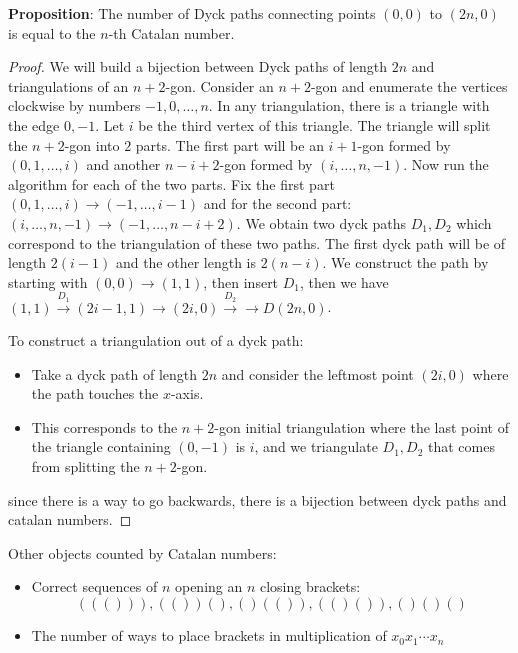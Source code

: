 \documentclass{report}
\begin{document}
\textbf{Proposition}: The number of Dyck paths connecting points $(0, 0)$ to $(2n, 0)$ is equal to the $n$-th Catalan number.
    \begin{proof}
        We will build a bijection between Dyck paths of length $2n$ and triangulations of an $n + 2$-gon. Consider an $n + 2$-gon and enumerate the vertices clockwise by numbers $-1, 0, \ldots , n$. In any triangulation, there is a triangle with the edge $0, -1$. Let $i$ be the third vertex of this triangle. The triangle will split the $n + 2$-gon into $2$ parts. The first part will be an $i + 1$-gon formed by $(0, 1, \ldots , i)$ and another $n - i + 2$-gon formed by $(i, \ldots , n, -1)$. Now run the algorithm for each of the two parts. Fix the first part $(0, 1, \ldots , i) \rightarrow (-1, \ldots , i - 1)$ and for the second part: $(i, \ldots , n, -1) \rightarrow (-1, \ldots , n - i + 2)$. We obtain two dyck paths $D_{1}, D_{2}$ which correspond to the triangulation of these two paths. The first dyck path will be of length $2(i - 1)$ and the other length is $2(n - i)$. We construct the path by starting with $(0, 0) \rightarrow (1, 1)$, then insert $D_{1}$, then we have $(1, 1) \xrightarrow{D_{1}} (2i - 1, 1) \rightarrow (2i, 0) \xrightarrow{D_{2}} \rightarrow D(2n, 0)$.

        To construct a triangulation out of a dyck path:
            \begin{itemize}
                \item Take a dyck path of length $2n$ and consider the leftmost point $(2i, 0)$ where the path touches the $x$-axis.

                \item This corresponds to the $n + 2$-gon initial triangulation where the last point of the triangle containing $(0, -1)$ is $i$, and we triangulate $D_{1}, D_{2}$ that comes from splitting the $n + 2$-gon.
            \end{itemize}
        since there is a way to go backwards, there is a bijection between dyck paths and catalan numbers.
    \end{proof}

Other objects counted by Catalan numbers:
    \begin{itemize}
        \item Correct sequences of $n$ opening an $n$ closing brackets:
            \begin{equation*}
                ((())), (())(), ()(()), (()()), ()()()
            \end{equation*}

        \item The number of ways to place brackets in multiplication  of $x_{0}x_{1}\cdots x_{n}$
    \end{itemize}
\end{document}
